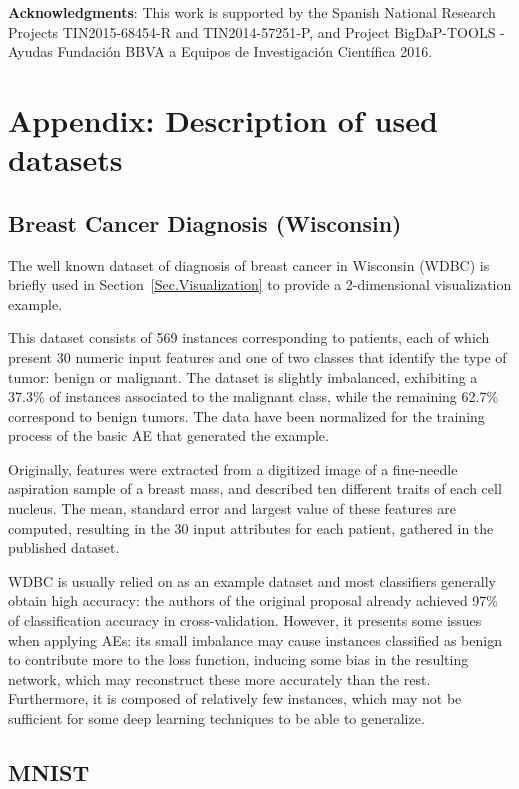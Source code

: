 \textbf{Acknowledgments}:  This work is supported by the Spanish National Research Projects TIN2015-68454-R and  TIN2014-57251-P, and Project BigDaP-TOOLS - Ayudas Fundaci\'on BBVA a Equipos de Investigaci\'on Cient\'ifica 2016. 

\section{Appendix: Description of used datasets}

\subsection{Breast Cancer Diagnosis (Wisconsin)}

The well known dataset of diagnosis of breast cancer in Wisconsin (WDBC) \cite{WDBC} is briefly used in Section~\ref{Sec.Visualization} to provide a 2-dimensional visualization example.

This dataset consists of 569 instances corresponding to patients, each of which present 30 numeric input features and one of two classes that identify the type of tumor: benign or malignant. The dataset is slightly imbalanced, exhibiting a 37.3\% of instances associated to the malignant class, while the remaining 62.7\% correspond to benign tumors. The data have been normalized for the training process of the basic AE that generated the example.

Originally, features were extracted from a digitized image of a fine-needle aspiration sample of a breast mass, and described ten different traits of each cell nucleus. The mean, standard error and largest value of these features are computed, resulting in the 30 input attributes for each patient, gathered in the published dataset.

WDBC is usually relied on as an example dataset and most classifiers generally obtain high accuracy: the authors of the original proposal already achieved 97\% of classification accuracy in cross-validation. However, it presents some issues when applying AEs: its small imbalance may cause instances classified as benign to contribute more to the loss function, inducing some bias in the resulting network, which may reconstruct these more accurately than the rest. Furthermore, it is composed of relatively few instances, which may not be sufficient for some deep learning techniques to be able to generalize.

\subsection{MNIST}

